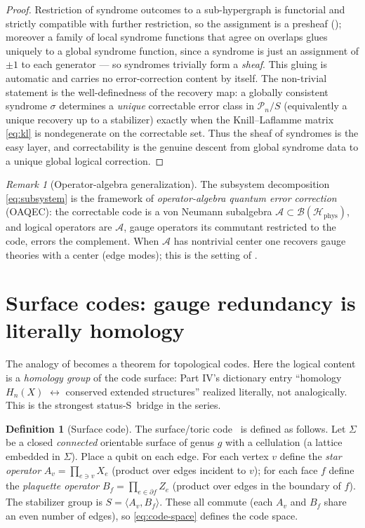 \documentclass[12pt]{article}
\theoremstyle{definition}
\newtheorem{definition}[theorem]{Definition}
\theoremstyle{remark}
\newtheorem{remark}[theorem]{Remark}
\newcommand{\Ho}{\mathcal{H}}
\newcommand{\Hphys}{\Ho_{\mathrm{phys}}}
\newcommand{\Pauli}{\mathcal{P}}
\newcommand{\Ss}{\textsf{S}}
\begin{document}
\begin{proof}
Restriction of syndrome outcomes to a sub-hypergraph is functorial and strictly
compatible with further restriction, so the assignment is a presheaf
(); moreover a family of local syndrome functions that agree on
overlaps glues uniquely to a global syndrome function, since a syndrome is just an
assignment of $\pm1$ to each generator --- so syndromes trivially form a \emph{sheaf}.
This gluing is automatic and carries no error-correction content by itself. The
non-trivial statement is the well-definedness of the recovery map: a globally consistent
syndrome $\sigma$ determines a \emph{unique} correctable error class in $\Pauli_n/S$
(equivalently a unique recovery up to a stabilizer) exactly when the Knill--Laflamme
matrix \eqref{eq:kl} is nondegenerate on the correctable set. Thus the sheaf of syndromes
is the easy layer, and correctability is the genuine descent from global syndrome data to
a unique global logical correction.
\end{proof}

\begin{remark}[Operator-algebra generalization]
\label{rem:oaqec}
The subsystem decomposition \eqref{eq:subsystem} is the framework of
\emph{operator-algebra quantum error correction} (OAQEC): the correctable code is a von
Neumann subalgebra $\mathcal A\subset\mathcal B(\Hphys)$, and logical operators are
$\mathcal A$, gauge operators its commutant restricted to the code, errors the
complement. When $\mathcal A$ has nontrivial center one recovers gauge theories with a
center (edge modes); this is the setting of .
\end{remark}

\section{Surface codes: gauge redundancy is literally homology}
\label{sec:surface}

The analogy of  becomes a theorem for topological codes. Here the
logical content is a \emph{homology group} of the code surface: Part IV's dictionary
entry ``homology $H_n(X)$ $\leftrightarrow$ conserved extended structures'' realized
literally, not analogically. This is the strongest status-\Ss\ bridge in the series.

\begin{definition}[Surface code]
\label{def:surface-code}
The surface/toric code~\cite{Kitaev,DKLP} is defined as follows. Let $\Sigma$ be a closed
\emph{connected} orientable surface of genus $g$ with a cellulation (a lattice embedded in
$\Sigma$).
Place a qubit on each edge. For each vertex $v$ define the
\emph{star operator} $A_v=\prod_{e\ni v}X_e$ (product over edges incident to $v$); for
each face $f$ define the \emph{plaquette operator} $B_f=\prod_{e\in\partial f}Z_e$
(product over edges in the boundary of $f$). The stabilizer group is
$S=\langle A_v, B_f\rangle$. These all commute (each $A_v$ and $B_f$ share an even number
of edges), so \eqref{eq:code-space} defines the code space.
\end{definition}
\end{document}
